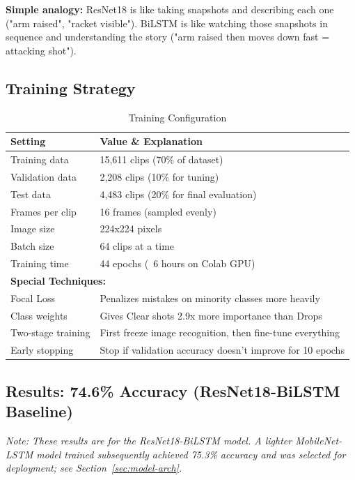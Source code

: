 \documentclass[11pt,a4paper]{article}
\begin{document}
\textbf{Simple analogy:} ResNet18 is like taking snapshots and describing each one ("arm raised", "racket visible"). BiLSTM is like watching those snapshots in sequence and understanding the story ("arm raised then moves down fast = attacking shot").

\subsection{Training Strategy}

\begin{table}[H]
\centering
\caption{Training Configuration}
\begin{tabular}{ll}
\toprule
\textbf{Setting} & \textbf{Value \& Explanation} \\
\midrule
Training data & 15,611 clips (70\% of dataset) \\
Validation data & 2,208 clips (10\% for tuning) \\
Test data & 4,483 clips (20\% for final evaluation) \\
Frames per clip & 16 frames (sampled evenly) \\
Image size & 224x224 pixels \\
Batch size & 64 clips at a time \\
Training time & 44 epochs (~6 hours on Colab GPU) \\
\midrule
\multicolumn{2}{l}{\textbf{Special Techniques:}} \\
Focal Loss & Penalizes mistakes on minority classes more heavily \\
Class weights & Gives Clear shots 2.9x more importance than Drops \\
Two-stage training & First freeze image recognition, then fine-tune everything \\
Early stopping & Stop if validation accuracy doesn't improve for 10 epochs \\
\bottomrule
\end{tabular}
\end{table}

\subsection{Results: 74.6\% Accuracy (ResNet18-BiLSTM Baseline)}\label{sec:resnet-results}

\textit{Note: These results are for the ResNet18-BiLSTM model. A lighter MobileNet-LSTM model trained subsequently achieved 75.3\% accuracy and was selected for deployment; see Section~\ref{sec:model-arch}.}
\end{document}
